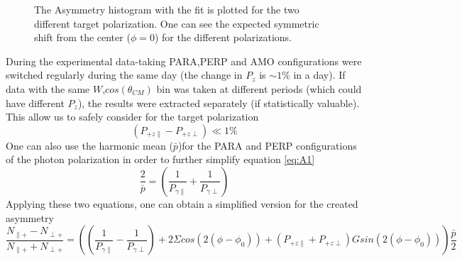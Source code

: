 \begin{figure}[H]
  \begin{center}
    \caption{The Asymmetry histogram with the fit is plotted for the two different target polarization. One can see the expected symmetric shift from the center ($\phi = 0$) for the different polarizations.  }
    \label{fig:GTgpol}
  \end{center}
\end{figure} 
During the experimental data-taking PARA,PERP and AMO configurations were switched regularly during the same day (the change in $P_z$ is $\sim 1\%$ in a day). If data with the same $W$,$cos(\theta_{CM})$ bin was taken at different periods (which could have different $P_z$), the results were extracted separately (if statistically valuable). This allow us to safely consider for the target polarization
\begin{equation}
  (P_{+z\parallel}-P_{+z\perp}) \ll 1 \% 
\end{equation}
One can also use the harmonic mean ($\bar{p}$)for the PARA and PERP configurations of the photon polarization in order to further simplify equation \ref{eq:A1} 
\begin{equation}
  \frac{2}{\bar{p}} = \left(\frac{1}{P_{\gamma \parallel}} + \frac{1}{P_{\gamma \perp}}\right)
\end{equation}
Applying these two equations, one can obtain a simplified version for the created asymmetry
\begin{equation}
  \frac{N_{\parallel +} - N_{\perp +}}{N_{\parallel +} + N_{\perp +}} = \left( (\frac{1}{P_{\gamma \parallel}} - \frac{1}{P_{\gamma \perp}}) + 2 \Sigma cos(2(\phi-\phi_0)) +  (P_{+z\parallel}+P_{+z\perp}) G sin(2(\phi-\phi_0)) \right) \frac{\bar{p}}{2} \label{eq:A2}
\end{equation}
